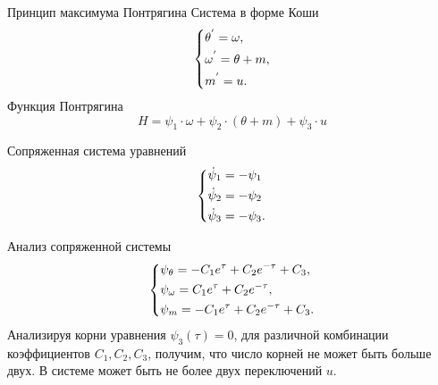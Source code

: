 \documentclass[10pt]{beamer}
\begin{document}
\begin{frame}{Принцип максимума Понтрягина}
	Система в форме Коши
	\begin{equation}\label{koshisystem}
		\left\{ {\begin{aligned}
					 & \theta^{'} = \omega , \hfill   \\
					 & \omega^{'} = \theta+m , \hfill \\
					 & m^{'} = u . \hfill             \\
				\end{aligned}} \right.
	\end{equation}
	Функция Понтрягина
	\[
		H=\psi_1\cdot\omega+\psi_2\cdot(\theta+m)+\psi_3\cdot u
	\]

	Сопряженная система уравнений
	\begin{equation} \label{7}
		\left\{ {\begin{aligned}
					 & \dot \psi _1  = - \psi_1\hfill  \\
					 & \dot \psi _2   = - \psi_2\hfill \\
					 & \dot \psi _3   = - \psi_3 . \hfill        \\
				\end{aligned}} \right.
	\end{equation}

\end{frame}

\begin{frame}{Анализ сопряженной системы}
	\begin{equation}\label{psisystem}
		\left\{ {\begin{aligned}
					 & \psi_\theta = -C_1e^\tau+C_2e^{-\tau}+C_3, \hfill \\
					 & \psi_\omega = C_1e^\tau+C_2e^{-\tau} , \hfill     \\
					 & \psi_m = -C_1e^\tau+C_2e^{-\tau}+C_3 . \hfill     \\
				\end{aligned}} \right.
	\end{equation}
	Анализируя корни уравнения $\psi_3(\tau)=0$, для различной комбинации
	коэффициентов $C_1,C_2,C_3$, получим, что число корней не может быть больше двух. В системе может быть не более двух переключений $u$.
\end{frame}
\end{document}
